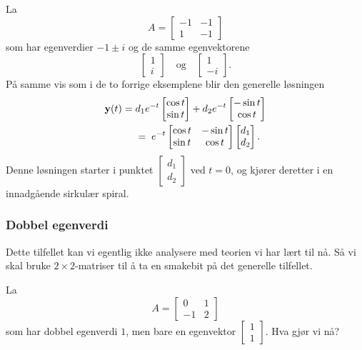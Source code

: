 \begin{ex}
La 
\[
A=
\begin{bmatrix}
-1 & -1   \\
1 & -1
\end{bmatrix}
\]
som har egenverdier $-1\pm i$ og de samme egenvektorene
\[
\begin{bmatrix}
1  \\
i 
\end{bmatrix}
\quad \text{og} \quad
\begin{bmatrix}
1  \\
-i 
\end{bmatrix}. 
\]
På samme vis som i de to forrige eksemplene blir den generelle løsningen 
\begin{align*}
\mathbf{y}(t)=\;&d_1e^{-t}\begin{bmatrix} \cos t \\ \sin t\end{bmatrix}+d_2e^{-t}\begin{bmatrix}  -\sin t \\ \cos t\end{bmatrix}\\&=\;e^{-t}\begin{bmatrix} \cos t & -\sin t\\ \sin t & \cos t\end{bmatrix}\begin{bmatrix} d_1 \\ d_2 \end{bmatrix}.
\end{align*}
Denne løsningen starter i punktet $\begin{bmatrix} d_1 \\ d_2 \end{bmatrix}$ ved $t=0$, og kjører deretter i en innadgående sirkulær spiral.
\end{ex}

\subsubsection*{Dobbel egenverdi}
Dette tilfellet kan vi egentlig ikke analysere med teorien vi har lært til nå. Så vi skal bruke $2 \times 2$-matriser til å ta en smakebit på det generelle tilfellet. 

\begin{ex}
La 
\[
A=
\begin{bmatrix}
0 & 1   \\
-1 & 2
\end{bmatrix}
\]
som har dobbel egenverdi $1$, men bare en egenvektor
$
\begin{bmatrix}
1  \\
1 
\end{bmatrix}
$.
Hva gjør vi nå?
\end{ex}

